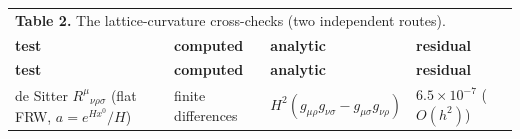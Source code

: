 \documentclass[aps,prd,amsmath,amssymb,superscriptaddress,longbibliography,floatfix,preprint]{revtex4-2}
\begin{document}
{\footnotesize
\setlength{\tabcolsep}{4pt}
\renewcommand{\arraystretch}{1.45}

\begin{longtable}{llll}
\multicolumn{4}{l}{\textbf{Table 2.} The lattice-curvature cross-checks (two independent routes).} \\
\addlinespace[2pt]
\toprule
\parbox[c]{4.57cm}{\vspace{2.5pt}\raggedright {} \textbf{test}\vspace{2.5pt}} & \parbox[c]{2.82cm}{\vspace{2.5pt}\raggedright {} \textbf{computed}\vspace{2.5pt}} & \parbox[c]{2.25cm}{\vspace{2.5pt}\raggedright {} \textbf{analytic}\vspace{2.5pt}} & \parbox[c]{5.01cm}{\vspace{2.5pt}\raggedright {} \textbf{residual}\vspace{2.5pt}} \\
\midrule
\endfirsthead
\toprule
\parbox[c]{4.57cm}{\vspace{2.5pt}\raggedright {} \textbf{test}\vspace{2.5pt}} & \parbox[c]{2.82cm}{\vspace{2.5pt}\raggedright {} \textbf{computed}\vspace{2.5pt}} & \parbox[c]{2.25cm}{\vspace{2.5pt}\raggedright {} \textbf{analytic}\vspace{2.5pt}} & \parbox[c]{5.01cm}{\vspace{2.5pt}\raggedright {} \textbf{residual}\vspace{2.5pt}} \\
\midrule
\endhead
\midrule
\endfoot
\bottomrule
\endlastfoot
\parbox[c]{4.57cm}{\vspace{2.5pt}\raggedright {} de Sitter \mbox{$R^\mu{}_{\nu\rho\sigma}$} (flat FRW, \mbox{$a = e^{Hx^0}/H$})\vspace{2.5pt}} & \parbox[c]{2.82cm}{\vspace{2.5pt}\raggedright {} finite differences\vspace{2.5pt}} & \parbox[c]{2.25cm}{\vspace{2.5pt}\raggedright {} $H^2(g_{\mu\rho}g_{\nu\sigma} - g_{\mu\sigma}g_{\nu\rho})$\vspace{2.5pt}} & \parbox[c]{5.01cm}{\vspace{2.5pt}\raggedright {} \mbox{$6.5\times10^{-7}$} (\mbox{$O(h^2)$})\vspace{2.5pt}} \\

\end{longtable}}
\end{document}
